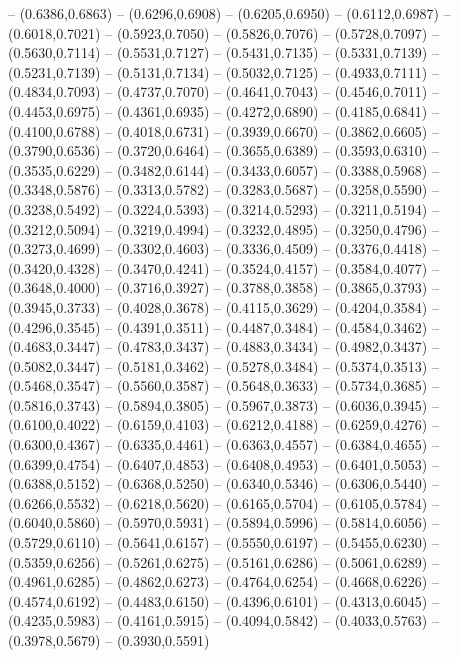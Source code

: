 {	-- (0.6386,0.6863)
	-- (0.6296,0.6908)
	-- (0.6205,0.6950)
	-- (0.6112,0.6987)
	-- (0.6018,0.7021)
	-- (0.5923,0.7050)
	-- (0.5826,0.7076)
	-- (0.5728,0.7097)
	-- (0.5630,0.7114)
	-- (0.5531,0.7127)
	-- (0.5431,0.7135)
	-- (0.5331,0.7139)
	-- (0.5231,0.7139)
	-- (0.5131,0.7134)
	-- (0.5032,0.7125)
	-- (0.4933,0.7111)
	-- (0.4834,0.7093)
	-- (0.4737,0.7070)
	-- (0.4641,0.7043)
	-- (0.4546,0.7011)
	-- (0.4453,0.6975)
	-- (0.4361,0.6935)
	-- (0.4272,0.6890)
	-- (0.4185,0.6841)
	-- (0.4100,0.6788)
	-- (0.4018,0.6731)
	-- (0.3939,0.6670)
	-- (0.3862,0.6605)
	-- (0.3790,0.6536)
	-- (0.3720,0.6464)
	-- (0.3655,0.6389)
	-- (0.3593,0.6310)
	-- (0.3535,0.6229)
	-- (0.3482,0.6144)
	-- (0.3433,0.6057)
	-- (0.3388,0.5968)
	-- (0.3348,0.5876)
	-- (0.3313,0.5782)
	-- (0.3283,0.5687)
	-- (0.3258,0.5590)
	-- (0.3238,0.5492)
	-- (0.3224,0.5393)
	-- (0.3214,0.5293)
	-- (0.3211,0.5194)
	-- (0.3212,0.5094)
	-- (0.3219,0.4994)
	-- (0.3232,0.4895)
	-- (0.3250,0.4796)
	-- (0.3273,0.4699)
	-- (0.3302,0.4603)
	-- (0.3336,0.4509)
	-- (0.3376,0.4418)
	-- (0.3420,0.4328)
	-- (0.3470,0.4241)
	-- (0.3524,0.4157)
	-- (0.3584,0.4077)
	-- (0.3648,0.4000)
	-- (0.3716,0.3927)
	-- (0.3788,0.3858)
	-- (0.3865,0.3793)
	-- (0.3945,0.3733)
	-- (0.4028,0.3678)
	-- (0.4115,0.3629)
	-- (0.4204,0.3584)
	-- (0.4296,0.3545)
	-- (0.4391,0.3511)
	-- (0.4487,0.3484)
	-- (0.4584,0.3462)
	-- (0.4683,0.3447)
	-- (0.4783,0.3437)
	-- (0.4883,0.3434)
	-- (0.4982,0.3437)
	-- (0.5082,0.3447)
	-- (0.5181,0.3462)
	-- (0.5278,0.3484)
	-- (0.5374,0.3513)
	-- (0.5468,0.3547)
	-- (0.5560,0.3587)
	-- (0.5648,0.3633)
	-- (0.5734,0.3685)
	-- (0.5816,0.3743)
	-- (0.5894,0.3805)
	-- (0.5967,0.3873)
	-- (0.6036,0.3945)
	-- (0.6100,0.4022)
	-- (0.6159,0.4103)
	-- (0.6212,0.4188)
	-- (0.6259,0.4276)
	-- (0.6300,0.4367)
	-- (0.6335,0.4461)
	-- (0.6363,0.4557)
	-- (0.6384,0.4655)
	-- (0.6399,0.4754)
	-- (0.6407,0.4853)
	-- (0.6408,0.4953)
	-- (0.6401,0.5053)
	-- (0.6388,0.5152)
	-- (0.6368,0.5250)
	-- (0.6340,0.5346)
	-- (0.6306,0.5440)
	-- (0.6266,0.5532)
	-- (0.6218,0.5620)
	-- (0.6165,0.5704)
	-- (0.6105,0.5784)
	-- (0.6040,0.5860)
	-- (0.5970,0.5931)
	-- (0.5894,0.5996)
	-- (0.5814,0.6056)
	-- (0.5729,0.6110)
	-- (0.5641,0.6157)
	-- (0.5550,0.6197)
	-- (0.5455,0.6230)
	-- (0.5359,0.6256)
	-- (0.5261,0.6275)
	-- (0.5161,0.6286)
	-- (0.5061,0.6289)
	-- (0.4961,0.6285)
	-- (0.4862,0.6273)
	-- (0.4764,0.6254)
	-- (0.4668,0.6226)
	-- (0.4574,0.6192)
	-- (0.4483,0.6150)
	-- (0.4396,0.6101)
	-- (0.4313,0.6045)
	-- (0.4235,0.5983)
	-- (0.4161,0.5915)
	-- (0.4094,0.5842)
	-- (0.4033,0.5763)
	-- (0.3978,0.5679)
	-- (0.3930,0.5591)
}
